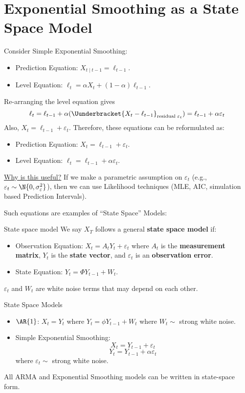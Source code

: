 \section{Exponential Smoothing as a State Space Model}
Consider Simple Exponential Smoothing:
\begin{itemize}
    \item Prediction Equation: $ X_{t\mid t-1}=\ell_{t-1} $.
    \item Level Equation: $ \ell_t=\alpha X_t+(1-\alpha)\ell_{t-1} $.
\end{itemize}
Re-arranging the level equation gives
\[ \ell_t=\ell_{t-1}+\alpha(\Uunderbracket{X_t-\ell_{t-1}}_{\text{residual $ \varepsilon_t $}})=\ell_{t-1}+\alpha \varepsilon_t \]
Also, $ X_t=\ell_{t-1}+\varepsilon_t $. Therefore, these equations
can be reformulated as:
\begin{itemize}
    \item Prediction Equation: $ X_t=\ell_{t-1}+\varepsilon_t $.
    \item Level Equation: $ \ell_t=\ell_{t-1}+\alpha \varepsilon_t $.
\end{itemize}
\underline{Why is this useful?} If we make a parametric assumption
on $ \varepsilon_t $ (e.g., $ \varepsilon_t \sim \N{0,\sigma_{\varepsilon}^2} $),
then we can use Likelihood techniques (MLE, AIC, simulation based Prediction Intervals).

Such equations are examples of ``State Space'' Models:
\begin{Definition}{State space model}{}
    We say $ X_T $ follows a general \textbf{state space model}
    if:
    \begin{itemize}
        \item Observation Equation: $ X_t= A_t Y_t+\varepsilon_t $
              where $ A_t $ is the \textbf{measurement matrix}, $ Y_t $ is the \textbf{state vector},
              and $ \varepsilon_t $ is an \textbf{observation error}.
        \item State Equation: $ Y_t=\Phi Y_{t-1}+W_t $.
    \end{itemize}
    $ \varepsilon_t $ and $ W_t $ are white noise terms that may depend on each other.
\end{Definition}
\begin{Example}{State Space Models}{}
    \begin{itemize}
        \item $ \AR{1} $: $ X_t=Y_t $ where $ Y_t=\phi Y_{t-1}+W_t $
              where $ W_t \sim  $ strong white noise.
        \item Simple Exponential Smoothing:
              \[ X_t=Y_{t-1}+\varepsilon_t \]
              \[ Y_t=Y_{t-1}+\alpha \varepsilon_t \]
              where $ \varepsilon_t \sim  $ strong white noise.
    \end{itemize}
    All ARMA and Exponential Smoothing models can be written in state-space form.
\end{Example}
